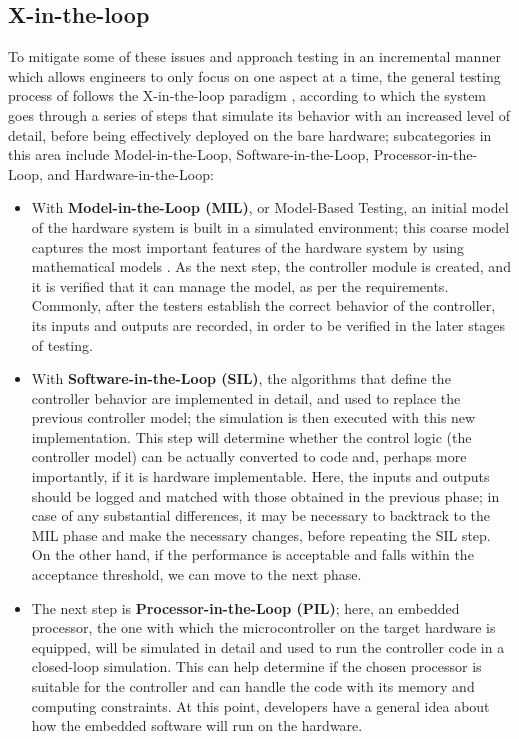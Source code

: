 \subsection{X-in-the-loop}
To mitigate some of these issues and approach \es testing in an incremental manner which allows engineers to only focus on one aspect at a time, the general testing process of \ess follows the X-in-the-loop paradigm \cite{DBLP:journals/software/GarousiFKY18}, according to which the system goes through a series of steps that simulate its behavior with an increased level of detail, before being effectively deployed on the bare hardware; subcategories in this area include Model-in-the-Loop, Software-in-the-Loop, Processor-in-the-Loop, and Hardware-in-the-Loop:
\begin{itemize}
    \item With \textbf{Model-in-the-Loop (MIL)}, or Model-Based Testing, an initial model of the hardware system is built in a simulated environment; this coarse model captures the most important features of the hardware system by using mathematical models \cite{XLoop}. As the next step, the controller module is created, and it is verified that it can manage the model, as per the requirements. Commonly, after the testers establish the correct behavior of the controller, its inputs and outputs are recorded, in order to be verified in the later stages of testing.
    \item With \textbf{Software-in-the-Loop (SIL)}, the algorithms that define the controller behavior are implemented in detail, and used to replace the previous controller model; the simulation is then executed with this new implementation. This step will determine whether the control logic (\ie the controller model) can be actually converted to code and, perhaps more importantly, if it is hardware implementable. Here, the inputs and outputs should be logged and matched with those obtained in the previous phase; in case of any substantial differences, it may be necessary to backtrack to the MIL phase and make the necessary changes, before repeating the SIL step. On the other hand, if the performance is acceptable and falls within the acceptance threshold, we can move to the next phase.
    \item The next step is \textbf{Processor-in-the-Loop (PIL)}; here, an embedded processor, the one with which the microcontroller on the target hardware is equipped, will be simulated in detail and used to run the controller code in a closed-loop simulation. This can help determine if the chosen processor is suitable for the controller and can handle the code with its memory and computing constraints. At this point, developers have a general idea about how the embedded software will run on the hardware.

\end{itemize}
